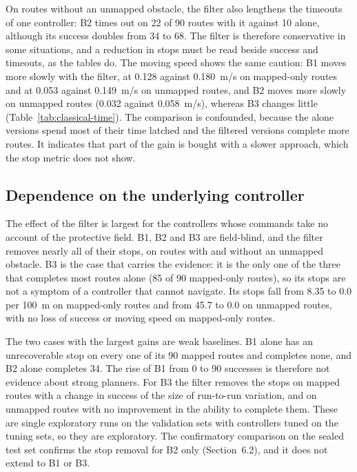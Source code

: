 On routes without an unmapped obstacle, the filter also lengthens the timeouts of one controller: B2 times out on 22 of 90 routes with it against 10 alone, although its success doubles from 34 to 68. The filter is therefore conservative in some situations, and a reduction in stops must be read beside success and timeouts, as the tables do. The moving speed shows the same caution: B1 moves more slowly with the filter, at 0.128 against 0.180~m/s on mapped-only routes and at 0.053 against 0.149~m/s on unmapped routes, and B2 moves more slowly on unmapped routes (0.032 against 0.058~m/s), whereas B3 changes little (Table~\ref{tab:classical-time}). The comparison is confounded, because the alone versions spend most of their time latched and the filtered versions complete more routes. It indicates that part of the gain is bought with a slower approach, which the stop metric does not show.

\subsection{Dependence on the underlying controller}
The effect of the filter is largest for the controllers whose commands take no account of the protective field. B1, B2 and B3 are field-blind, and the filter removes nearly all of their stops, on routes with and without an unmapped obstacle. B3 is the case that carries the evidence: it is the only one of the three that completes most routes alone (85 of 90 mapped-only routes), so its stops are not a symptom of a controller that cannot navigate. Its stops fall from 8.35 to 0.0 per 100~m on mapped-only routes and from 45.7 to 0.0 on unmapped routes, with no loss of success or moving speed on mapped-only routes.

The two cases with the largest gains are weak baselines. B1 alone has an unrecoverable stop on every one of its 90 mapped routes and completes none, and B2 alone completes 34. The rise of B1 from 0 to 90 successes is therefore not evidence about strong planners. For B3 the filter removes the stops on mapped routes with a change in success of the size of run-to-run variation, and on unmapped routes with no improvement in the ability to complete them. These are single exploratory runs on the validation sets with controllers tuned on the tuning sets, so they are exploratory. The confirmatory comparison on the sealed test set confirms the stop removal for B2 only (Section~6.2), and it does not extend to B1 or B3.

